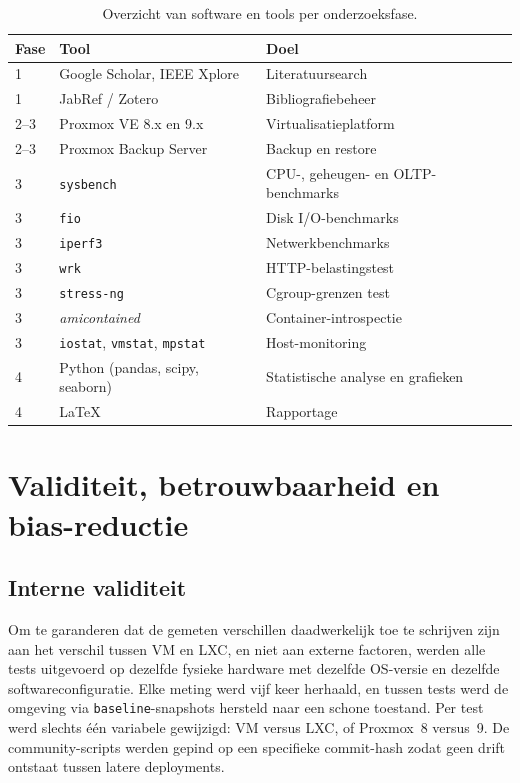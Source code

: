 \begin{table}[h]
    \centering
    \caption[Gebruikte software en tools]{Overzicht van software en tools per onderzoeksfase.}
    \label{tab:tools}
    \begin{tabular}{lll}
        \toprule
        \textbf{Fase} & \textbf{Tool} & \textbf{Doel} \\
        \midrule
        1   & Google Scholar, IEEE Xplore & Literatuursearch \\
        1   & JabRef / Zotero            & Bibliografiebeheer \\
        2--3& Proxmox VE 8.x en 9.x     & Virtualisatieplatform \\
        2--3& Proxmox Backup Server      & Backup en restore \\
        3   & \texttt{sysbench}          & CPU-, geheugen- en OLTP-benchmarks \\
        3   & \texttt{fio}               & Disk I/O-benchmarks \\
        3   & \texttt{iperf3}            & Netwerkbenchmarks \\
        3   & \texttt{wrk}               & HTTP-belastingstest \\
        3   & \texttt{stress-ng}         & Cgroup-grenzen test \\
        3   & \textit{amicontained}      & Container-introspectie \\
        3   & \texttt{iostat}, \texttt{vmstat}, \texttt{mpstat} & Host-monitoring \\
        4   & Python (pandas, scipy, seaborn) & Statistische analyse en grafieken \\
        4   & \LaTeX{}                   & Rapportage \\
        \bottomrule
    \end{tabular}
\end{table}

\section{Validiteit, betrouwbaarheid en bias-reductie}
\label{sec:validiteit}

\subsection{Interne validiteit}
Om te garanderen dat de gemeten verschillen daadwerkelijk toe te schrijven zijn aan het verschil tussen VM en LXC, en niet aan externe factoren, werden alle tests uitgevoerd op dezelfde fysieke hardware met dezelfde OS-versie en dezelfde softwareconfiguratie. Elke meting werd vijf keer herhaald, en tussen tests werd de omgeving via \texttt{baseline}-snapshots hersteld naar een schone toestand. Per test werd slechts één variabele gewijzigd: VM versus LXC, of Proxmox~8 versus~9. De community-scripts werden gepind op een specifieke commit-hash zodat geen drift ontstaat tussen latere deployments.

